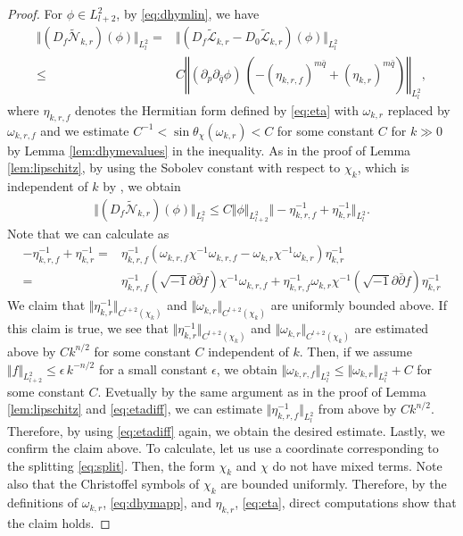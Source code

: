 \documentclass{amsart}
\numberwithin{equation}{section}
\theoremstyle{plain}
\theoremstyle{definition}
\theoremstyle{remark}
\begin{document}
\begin{proof}
    For $\phi\in L^2_{l+2}$, by \eqref{eq:dhymlin}, we have
    \begin{align*}
        \Vert (D_f\tilde{\mathcal{N}}_{k,r})(\phi)\Vert_{L^2_l}=&\Vert(D_f\tilde{\mathcal{L}}_{k,r}-D_0\tilde{\mathcal{L}}_{k,r})(\phi) \Vert_{L^2_l}\\
        \le&C\left\Vert (\partial_p\partial_{\bar{q}}\phi)\,  \left(-(\eta_{k,r,f})^{m\bar{q}}+(\eta_{k,r})^{m\bar{q}}\right)\right\Vert_{L^2_l},
    \end{align*}
    where $\eta_{k,r,f}$ denotes the Hermitian form defined by \eqref{eq:eta} with $\omega_{k,r}$ replaced by $\omega_{k,r,f}$ and we estimate $C^{-1}<\sin\theta_\chi(\omega_{k,r})<C$ for some constant $C$ for $k\gg0$ by Lemma \ref{lem:dhymevalues} in the inequality. As in the proof of Lemma \ref{lem:lipschitz}, by using the Sobolev constant with respect to $\chi_k$, which is independent of $k$ by \cite[Lemma 5.8]{Fine}, we obtain
    \begin{align*}
        \Vert (D_f\tilde{\mathcal{N}}_{k,r})(\phi)\Vert_{L^2_l}\le C\Vert\phi\Vert_{L^2_{l+2}}\Vert-\eta_{k,r,f}^{-1}+\eta_{k,r}^{-1}\Vert_{L^2_l}.
    \end{align*}
    Note that we can calculate as 
    \begin{equation}\label{eq:etadiff}
        \begin{split}
            -\eta_{k,r,f}^{-1}+\eta_{k,r}^{-1}
            =&\eta_{k,r,f}^{-1}(\omega_{k,r,f}\chi^{-1}\omega_{k,r,f}-\omega_{k,r}\chi^{-1}\omega_{k,r})\eta_{k,r}^{-1}\\
            =&\eta_{k,r,f}^{-1}(\sqrt{-1}\partial\bar{\partial}f)\chi^{-1}\omega_{k,r,f}+\eta_{k,r,f}^{-1}\omega_{k,r}\chi^{-1}(\sqrt{-1}\partial\bar{\partial}f)\eta_{k,r}^{-1}
        \end{split}
    \end{equation}
    We claim that $\Vert\eta_{k,r}^{-1}\Vert_{C^{l+2}(\chi_k)}$ and $\Vert\omega_{k,r}\Vert_{C^{l+2}(\chi_k)}$ are uniformly bounded above. If this claim is true, we see that $\Vert\eta_{k,r}^{-1}\Vert_{C^{l+2}(\chi_k)}$ and $\Vert\omega_{k,r}\Vert_{C^{l+2}(\chi_k)}$ are estimated above by $Ck^{n/2}$ for some constant $C$ independent of $k$. Then, if we assume $\Vert f\Vert_{L^2_{l+2}}\le \epsilon\, k^{-n/2}$ for a small constant $\epsilon$, we obtain $\Vert\omega_{k,r,f}\Vert_{L^2_l}\le\Vert\omega_{k,r}\Vert_{L^2_l}+C$ for some constant $C$. Evetually by the same argument as in the proof of Lemma 
    \ref{lem:lipschitz} and \eqref{eq:etadiff}, we can estimate $\Vert\eta_{k,r,f}^{-1}\Vert_{L^2_l}$ from above by $Ck^{n/2}$. Therefore, by using \eqref{eq:etadiff} again, we obtain the desired estimate. Lastly, we confirm the claim above. To calculate, let us use a coordinate corresponding to the splitting \eqref{eq:split}. Then, the form $\chi_k$ and $\chi$ do not have mixed terms. Note also that the Christoffel symbols of $\chi_k$ are bounded uniformly. Therefore, by the definitions of $\omega_{k,r}$, \eqref{eq:dhymapp}, and $\eta_{k,r}$, \eqref{eq:eta}, direct computations show that the claim holds.
\end{proof}
\end{document}
